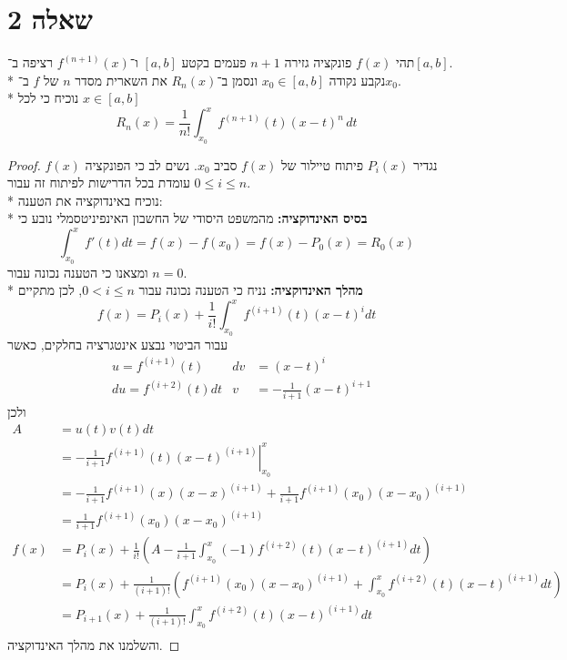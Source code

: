 \section{שאלה 2}
תהי $f(x)$ פונקציה גזירה $n + 1$ פעמים בקטע $[a, b]$ ו־$f^{(n + 1)}(x)$ רציפה ב־$[a, b]$. \\*
נקבע נקודה $x_0 \in [a, b]$ ונסמן ב־$R_n(x)$ את השארית מסדר $n$ של $f$ ב־$x_0$. \\*
נוכיח כי לכל $x \in [a, b]$
\[
	R_n(x) = \frac{1}{n!} \int_{x_0}^x f^{(n + 1)}(t){(x - t)}^n \, dt
\]
\begin{proof}
	נגדיר $P_i(x)$ פיתוח טיילור של $f(x)$ סביב $x_0$. נשים לב כי הפונקציה $f(x)$ עומדת בכל הדרישות לפיתוח זה עבור $0 \le i \le n$. \\*
	 נוכיח באינדוקציה את הטענה: \\*
	 \textbf{בסיס האינדוקציה:}
	 מהמשפט היסודי של החשבון האינפיניטסמלי נובע כי
	 \[
		 \int_{x_0}^x f'(t) dt = f(x) - f(x_0) = f(x) - P_0(x) = R_0(x)
	 \]
	 ומצאנו כי הטענה נכונה עבור $n = 0$. \\*
	 \textbf{מהלך האינדוקציה:}
	 נניח כי הטענה נכונה עבור $0 < i \le n$, לכן מתקיים
	 \[
		  f(x) = P_i(x) + \frac{1}{i!} \int_{x_0}^x f^{(i + 1)}(t) {(x - t)}^i dt
	 \]
	 עבור הביטוי נבצע אינטגרציה בחלקים, כאשר
	 \begin{align*}
		 & u = f^{(i + 1)}(t) & dv & = {(x - t)}^i \\
		 & du = f^{(i + 2)}(t) dt & v & = -\frac{1}{i + 1} {(x - t)}^{i + 1}
	 \end{align*}
	ולכן
	 \begin{align*}
		 A & = u(t) v(t) dt \\
		   & = \left. -\frac{1}{i + 1} f^{(i + 1)}(t){(x - t)}^{(i + 1)} \right|_{x_0}^x \\
		   & = -\frac{1}{i + 1} f^{(i + 1)}(x){(x - x)}^{(i + 1)} + \frac{1}{i + 1} f^{(i + 1)}(x_0){(x - x_0)}^{(i + 1)} \\
		   & = \frac{1}{i + 1} f^{(i + 1)}(x_0){(x - x_0)}^{(i + 1)} \\
		 f(x) & = P_i(x) + \frac{1}{i!} \left( A - \frac{1}{i + 1} \int_{x_0}^x (-1) f^{(i + 2)}(t) {(x - t)}^{(i + 1)} dt \right) \\
		 & = P_i(x) + \frac{1}{(i + 1)!} \left( f^{(i + 1)}(x_0){(x - x_0)}^{(i + 1)} + \int_{x_0}^x f^{(i + 2)}(t) {(x - t)}^{(i + 1)} dt \right) \\
		 & = P_{i + 1}(x) + \frac{1}{(i + 1)!} \int_{x_0}^x f^{(i + 2)}(t) {(x - t)}^{(i + 1)} dt \\
	 \end{align*}
	 והשלמנו את מהלך האינדוקציה.
\end{proof}

